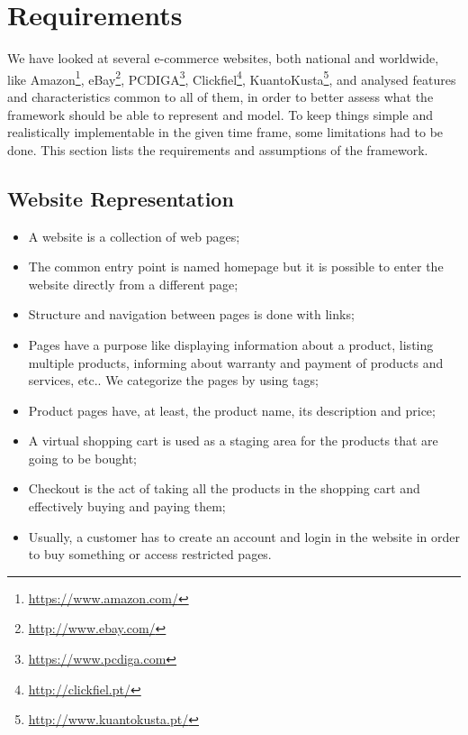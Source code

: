 
\section{Requirements}

We have looked at several e-commerce websites, both national and 
worldwide, like Amazon\footnote{\url{https://www.amazon.com/}}, 
eBay\footnote{\url{http://www.ebay.com/}}, 
PCDIGA\footnote{\url{https://www.pcdiga.com}}, 
Clickfiel\footnote{\url{http://clickfiel.pt/}}, 
KuantoKusta\footnote{\url{http://www.kuantokusta.pt/}}, and analysed features 
and characteristics common to all of them, in order to better assess what the 
framework should be able to represent and model. To keep things simple and 
realistically implementable in the given time frame, some limitations had to be 
done. This section lists the requirements and assumptions of the framework.

\subsection{Website Representation}

\begin{itemize}
    \item A website is a collection of web pages;
    \item The common entry point is named homepage but it is possible to enter 
    the website directly from a different page;
    \item Structure and navigation between pages is done with links;
    \item Pages have a purpose like displaying information about a 
    product, listing multiple products, informing about warranty and payment of 
    products and services, etc.. We categorize the pages by using tags;
    \item Product pages have, at least, the product name, its description and 
    price;
    \item A virtual shopping cart is used as a staging area for the products 
    that are going to be bought;
    \item Checkout is the act of taking all the products in the shopping cart 
    and effectively buying and paying them;
    \item Usually, a customer has to create an account and login in the website 
    in order to buy something or access restricted pages.
\end{itemize}

